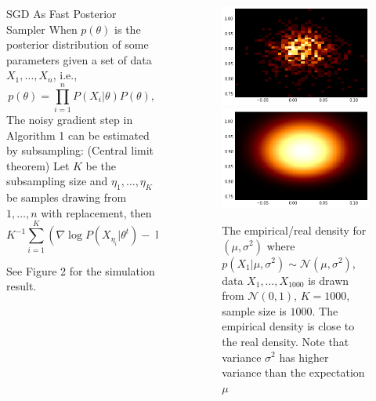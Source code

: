 \documentclass[final]{beamer}
\newlength{\sepwid}
\newlength{\onecolwid}
\newcommand{\N}{\mathscr{N}}
\newcommand{\cov}{\mathrm{cov}}
\begin{document}
\begin{frame}[t]
\begin{columns}[t]
\begin{column}{\onecolwid}

\begin{block}{SGD As Fast Posterior Sampler}
When $p(\theta)$ is the posterior distribution of some parameters given a set of data $X_1,\ldots, X_n$, i.e.,
\[
p(\theta) = \prod_{i=1}^n P(X_i|\theta) P(\theta),
\]
The noisy gradient step in Algorithm 1 can be estimated by subsampling:
(Central limit theorem)
Let $K$ be the subsampling size and $\eta_1,\ldots, \eta_K$ be samples drawing from $1,\ldots, n$ with replacement, then
\[
K^{-1}\sum_{i=1}^K (\nabla \log P(X_{\eta_i}|\theta^t) - \log P(\theta^t)) \sim \N(n^{-1} \nabla \log p(\theta) , K^{-1}\cov \nabla \log p(\theta)).
\]

See Figure 2 for the simulation result.

\end{block}


\end{column} %

\begin{column}{\sepwid}\end{column} %

\begin{column}{\onecolwid} %



\begin{figure}
\includegraphics[width=0.5\linewidth]{../figure/simulation2_empirical.png}
\includegraphics[width=0.5\linewidth]{../figure/simulation2_real.png}
\caption{The empirical/real density for $(\mu, \sigma^2)$ where $p(X_1|\mu, \sigma^2)\sim \N(\mu, \sigma^2)$, data $X_1,\ldots, X_{1000}$ is drawn from $\N(0, 1)$, $K = 1000$, sample size is $1000$. The empirical density is close to the real density. Note that variance $\sigma^2$ has higher variance than the expectation $\mu$}
\end{figure}



\end{column}
\end{columns}
\end{frame}
\end{document}
